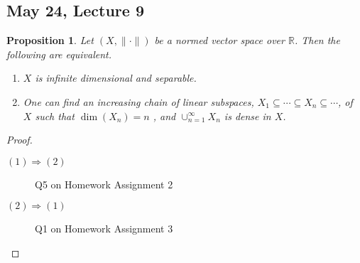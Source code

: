 \documentclass[11pt]{amsart}
\newtheorem{proposition}[theorem]{Proposition}
\theoremstyle{definition}
\numberwithin{equation}{section}
\newcommand{\bR}{ \mathbb{R} }	%
\newcommand{\nvs}{\left(X, \| \cdot \| \right)}					%
\begin{document}
\subsection{May 24, Lecture 9}

\vspace{6pt}

\begin{proposition}\label{prop:42}
Let $\nvs$ be a normed vector space over $\bR$. Then the following are equivalent.
\begin{enumerate}
\item $X$ is infinite dimensional and separable.
\item One can find an increasing chain of linear subspaces, $X_1 \subseteq \cdots \subseteq X_n \subseteq \cdots$, of $X$ such that $\dim(X_n) = n$ , and $\cup_{n=1}^\infty X_n$ is dense in $X$. 
\end{enumerate}
\end{proposition}

\begin{proof}
\begin{description}
\item[$(1) \Rightarrow (2)$] Q5 on Homework Assignment 2
\item[$(2) \Rightarrow (1)$] Q1 on Homework Assignment 3
\end{description}
\end{proof}
\end{document}
